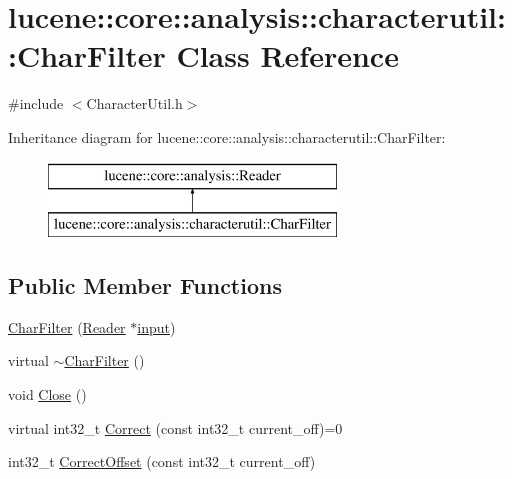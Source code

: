 \hypertarget{classlucene_1_1core_1_1analysis_1_1characterutil_1_1CharFilter}{}\section{lucene\+:\+:core\+:\+:analysis\+:\+:characterutil\+:\+:Char\+Filter Class Reference}
\label{classlucene_1_1core_1_1analysis_1_1characterutil_1_1CharFilter}


{\ttfamily \#include $<$Character\+Util.\+h$>$}

Inheritance diagram for lucene\+:\+:core\+:\+:analysis\+:\+:characterutil\+:\+:Char\+Filter\+:\begin{figure}[H]
\begin{center}
\leavevmode
\includegraphics[height=2.000000cm]{classlucene_1_1core_1_1analysis_1_1characterutil_1_1CharFilter}
\end{center}
\end{figure}
\subsection*{Public Member Functions}
\begin{DoxyCompactItemize}
\item 
\mbox{\hyperlink{classlucene_1_1core_1_1analysis_1_1characterutil_1_1CharFilter_ac13b7526b15e97a551071c2b759d1af1}{Char\+Filter}} (\mbox{\hyperlink{classlucene_1_1core_1_1analysis_1_1Reader}{Reader}} $\ast$\mbox{\hyperlink{classlucene_1_1core_1_1analysis_1_1characterutil_1_1CharFilter_a774b34856b115721d2ec012e475413c4}{input}})
\item 
virtual \mbox{\hyperlink{classlucene_1_1core_1_1analysis_1_1characterutil_1_1CharFilter_acf60f32d245a97caebc76508363d61b6}{$\sim$\+Char\+Filter}} ()
\item 
void \mbox{\hyperlink{classlucene_1_1core_1_1analysis_1_1characterutil_1_1CharFilter_a47ff3dc61979b80927ed5779cb55bd09}{Close}} ()
\item 
virtual int32\+\_\+t \mbox{\hyperlink{classlucene_1_1core_1_1analysis_1_1characterutil_1_1CharFilter_ad1be13a08cf750862795cb9b29ed4e09}{Correct}} (const int32\+\_\+t current\+\_\+off)=0
\item 
int32\+\_\+t \mbox{\hyperlink{classlucene_1_1core_1_1analysis_1_1characterutil_1_1CharFilter_a6e4becb7161f99dec056ef207fda3f23}{Correct\+Offset}} (const int32\+\_\+t current\+\_\+off)
\end{DoxyCompactItemize}
